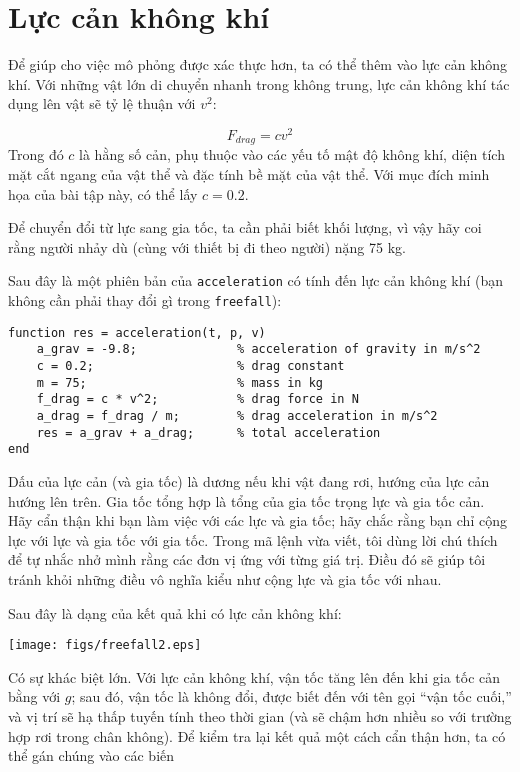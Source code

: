 \documentclass[12pt]{book}
\begin{document}
\section{Lực cản không khí}

Để giúp cho việc mô phỏng được xác thực hơn, ta có thể thêm vào
lực cản không khí. Với những vật lớn di chuyển nhanh trong không
trung, lực cản không khí tác dụng lên vật sẽ tỷ lệ thuận với $v^2$:

\[ F_{drag} = c v^2 \]
%
Trong đó $c$ là hằng số cản, phụ thuộc vào các yếu tố mật độ 
không khí, diện tích mặt cắt ngang của vật thể và đặc tính bề mặt
của vật thể. Với mục đích minh họa của bài tập này, có thể lấy $c = 0.2$.

Để chuyển đổi từ lực sang gia tốc, ta cần phải biết khối lượng, vì vậy
hãy coi rằng người nhảy dù (cùng với thiết bị đi theo người) nặng 75 kg.

Sau đây là một phiên bản của {\tt acceleration} có tính đến lực cản
không khí (bạn không cần phải thay đổi gì trong {\tt freefall}):

\begin{verbatim}
function res = acceleration(t, p, v)
    a_grav = -9.8;              % acceleration of gravity in m/s^2
    c = 0.2;                    % drag constant
    m = 75;                     % mass in kg
    f_drag = c * v^2;           % drag force in N
    a_drag = f_drag / m;        % drag acceleration in m/s^2
    res = a_grav + a_drag;      % total acceleration
end
\end{verbatim}
%
Dấu của lực cản (và gia tốc) là dương nếu khi vật đang rơi, hướng
của lực cản hướng lên trên. Gia tốc tổng hợp là tổng của gia tốc
trọng lực và gia tốc cản. Hãy cẩn thận khi bạn làm việc với các
lực và gia tốc; hãy chắc rằng bạn chỉ cộng lực với lực và gia tốc
với gia tốc. Trong mã lệnh vừa viết, tôi dùng lời chú thích để tự
nhắc nhở mình rằng các đơn vị ứng với từng giá trị. Điều đó sẽ
giúp tôi tránh khỏi những điều vô nghĩa kiểu như cộng lực và
gia tốc với nhau.

Sau đây là dạng của kết quả khi có lực cản không khí:

\centerline{\texttt{[image: figs/freefall2.eps]}}

Có sự khác biệt lớn. Với lực cản không khí, vận tốc tăng lên
đến khi gia tốc cản bằng với $g$; sau đó, vận tốc là không đổi,
được biết đến với tên gọi ``vận tốc cuối,'' và vị trí sẽ hạ thấp
tuyến tính theo thời gian (và sẽ chậm hơn nhiều so với trường hợp
rơi trong chân không). Để kiểm tra lại kết quả một cách cẩn thận
hơn, ta có thể gán chúng vào các biến
\end{document}
